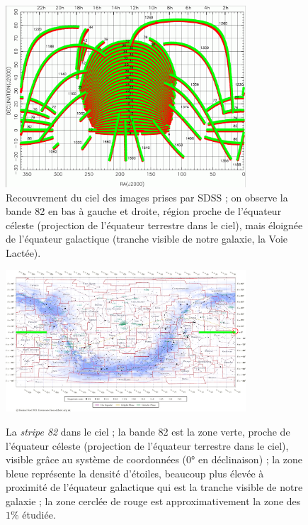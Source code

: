 	\begin{figure}[h]
		\centering
		\includegraphics[width=0.8\textwidth]{img/sdss-skycoverage.png}
		\caption[Recouvrement du ciel de SDSS]{Recouvrement du ciel des images prises par SDSS ; on observe la bande 82 en bas à gauche et droite, région proche de l'équateur céleste (projection de l'équateur terrestre dans le ciel), mais éloignée de l'équateur galactique (tranche visible de notre galaxie, la Voie Lactée).}
		\label{fig:sdss-skycoverage}
	\end{figure}

	\begin{figure}[h]
		\centering
		\includegraphics[width=0.8\textwidth]{img/sdss-galacticequator.png}
		\label{sdss:galacticequator}
		\caption[La \emph{stripe 82} dans le ciel]{La \emph{stripe 82} dans le ciel ; la bande 82 est la zone verte, proche de l'équateur céleste (projection de l'équateur terrestre dans le ciel), visible grâce au système de coordonnées ($0°$ en déclinaison) ; la zone bleue représente la densité d'étoiles, beaucoup plus élevée à proximité de l'équateur galactique qui est la tranche visible de notre galaxie ; la zone cerclée de rouge est approximativement la zone des $1\%$ étudiée.}
	\end{figure}

